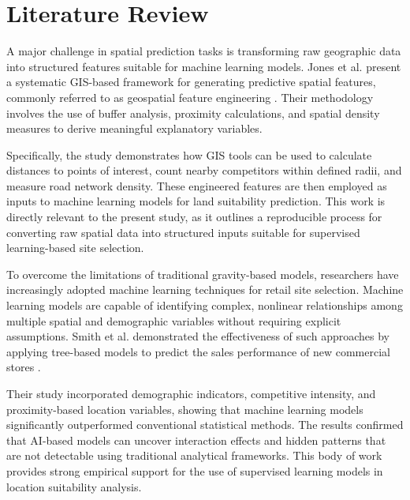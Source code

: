 \chapter{Literature Review}

\par A major challenge in spatial prediction tasks is transforming raw geographic data into structured features suitable for machine learning models. Jones et al. present a systematic GIS-based framework for generating predictive spatial features, commonly referred to as geospatial feature engineering \citep{jones2021spatial}. Their methodology involves the use of buffer analysis, proximity calculations, and spatial density measures to derive meaningful explanatory variables.

\par Specifically, the study demonstrates how GIS tools can be used to calculate distances to points of interest, count nearby competitors within defined radii, and measure road network density. These engineered features are then employed as inputs to machine learning models for land suitability prediction. This work is directly relevant to the present study, as it outlines a reproducible process for converting raw spatial data into structured inputs suitable for supervised learning-based site selection.

\par To overcome the limitations of traditional gravity-based models, researchers have increasingly adopted machine learning techniques for retail site selection. Machine learning models are capable of identifying complex, nonlinear relationships among multiple spatial and demographic variables without requiring explicit assumptions. Smith et al. demonstrated the effectiveness of such approaches by applying tree-based models to predict the sales performance of new commercial stores \citep{smith2022machine}.

\par Their study incorporated demographic indicators, competitive intensity, and proximity-based location variables, showing that machine learning models significantly outperformed conventional statistical methods. The results confirmed that AI-based models can uncover interaction effects and hidden patterns that are not detectable using traditional analytical frameworks. This body of work provides strong empirical support for the use of supervised learning models in location suitability analysis.

